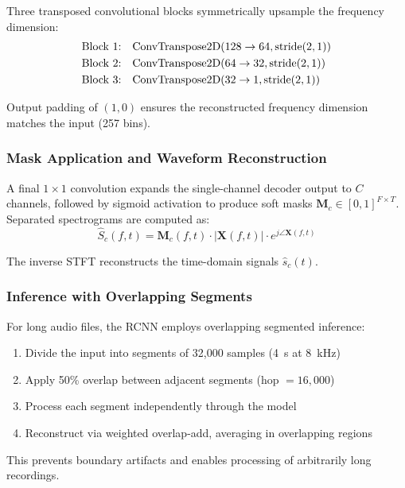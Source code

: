 \documentclass[conference]{IEEEtran}
\begin{document}
Three transposed convolutional blocks symmetrically upsample the frequency dimension:
\begin{align}
\text{Block 1:} &\quad \text{ConvTranspose2D}(128 \rightarrow 64, \text{stride}(2,1)) \notag \\
\text{Block 2:} &\quad \text{ConvTranspose2D}(64 \rightarrow 32, \text{stride}(2,1)) \notag \\
\text{Block 3:} &\quad \text{ConvTranspose2D}(32 \rightarrow 1, \text{stride}(2,1)) \notag
\end{align}

Output padding of $(1, 0)$ ensures the reconstructed frequency dimension matches the input (257 bins).

\subsubsection{Mask Application and Waveform Reconstruction}

A final $1 \times 1$ convolution expands the single-channel decoder output to $C$ channels, followed by sigmoid activation to produce soft masks $\mathbf{M}_c \in [0, 1]^{F \times T}$. Separated spectrograms are computed as:
\begin{equation}
\hat{S}_c(f, t) = \mathbf{M}_c(f, t) \cdot |\mathbf{X}(f, t)| \cdot e^{j \angle \mathbf{X}(f, t)}
\end{equation}

The inverse STFT reconstructs the time-domain signals $\hat{s}_c(t)$.

\subsubsection{Inference with Overlapping Segments}

For long audio files, the RCNN employs overlapping segmented inference:
\begin{enumerate}[leftmargin=*,nosep]
    \item Divide the input into segments of 32,000 samples (4~s at 8~kHz)
    \item Apply 50\% overlap between adjacent segments (hop $= 16,000$)
    \item Process each segment independently through the model
    \item Reconstruct via weighted overlap-add, averaging in overlapping regions
\end{enumerate}

This prevents boundary artifacts and enables processing of arbitrarily long recordings.
\end{document}
